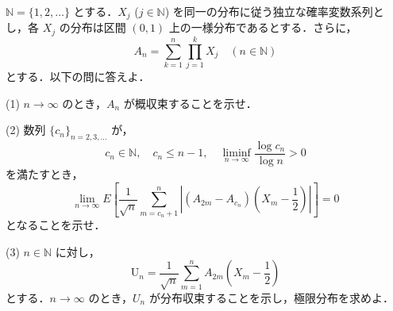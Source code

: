 \documentclass[12pt]{jlreq}
\begin{document}
\(\mathbb{N} = \{1, 2, \dots\}\) とする．\(X_j\) (\(j \in \mathbb{N}\)) を同一の分布に従う独立な確率変数系列とし，各 \(X_j\) の分布は区間 \((0,1)\) 上の一様分布であるとする．さらに，
\[
  A_n = \sum_{k=1}^n \prod_{j=1}^k X_j \quad (n \in \mathbb{N})
\]
とする．以下の問に答えよ．

(1) \(n \to \infty\) のとき，\(A_n\) が概収束することを示せ．

(2) 数列 \(\{c_n\}_{n=2,3,\dots}\) が，
  \[
    c_n \in \mathbb{N},\quad c_n \le n-1,\quad \liminf_{n \to \infty} \frac{\log c_n}{\log n} > 0
  \]
  を満たすとき，
  \[
    \lim_{n \to \infty} E\left[ \frac{1}{\sqrt{n}} \sum_{m=c_n+1}^n \left| (A_{2m} - A_{c_n})\left(X_m - \frac{1}{2}\right) \right| \right] = 0
  \]
  となることを示せ．

(3) \(n \in \mathbb{N}\) に対し，
  \[
    \text{U}_n = \frac{1}{\sqrt{n}} \sum_{m=1}^n A_{2m} \left(X_m - \frac{1}{2}\right)
  \]
  とする．\(n \to \infty\) のとき，\(U_n\) が分布収束することを示し，極限分布を求めよ．
\end{document}
